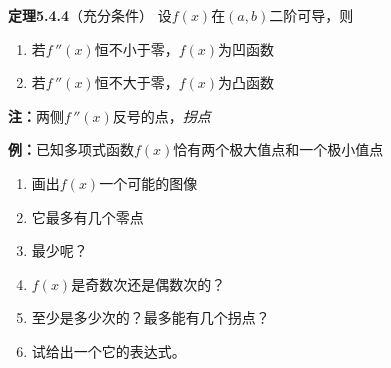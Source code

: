 {\bf 定理5.4.4}（充分条件）
设$f(x)$在$(a,b)$二阶可导，则
\begin{enumerate}[(1)]
  \setlength{\itemindent}{1cm}
  \item 若$f\,''(x)$恒不小于零，$f(x)$为凹函数
  \item 若$f\,''(x)$恒不大于零，$f(x)$为凸函数
\end{enumerate}

{\bf 注：}两侧$f\,''(x)$反号的点，{\it 拐点}

{\bf 例：}已知多项式函数$f(x)$恰有两个极大值点和一个极小值点
\begin{enumerate}[(1)]
  \setlength{\itemindent}{1cm}
  \item 画出$f(x)$一个可能的图像
  \item 它最多有几个零点
  \item 最少呢？
  \item $f(x)$是奇数次还是偶数次的？
  \item 至少是多少次的？最多能有几个拐点？
  \item 试给出一个它的表达式。
\end{enumerate}

